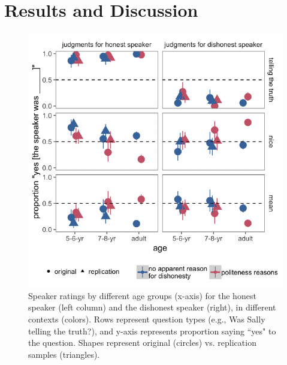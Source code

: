\documentclass[oneside]{report}
\begin{document}
\section{Results and Discussion}\label{results-and-discussion-3}
\begin{figure}[p]

{\centering \includegraphics[width=0.9\linewidth]{erica_yoon_dissertation_files/figure-latex/figTrupolResultsPlacement-1} 

}

\caption[Speaker ratings for the experiment in Chapter 3.]{Speaker ratings by different age groups (x-axis) for the honest speaker (left column) and the dishonest speaker (right), in different contexts (colors). Rows represent question types (e.g., Was Sally telling the truth?), and y-axis represents proportion saying ``yes" to the question. Shapes represent original (circles) vs. replication samples (triangles). }\label{fig:figTrupolResultsPlacement}
\end{figure}
\end{document}
